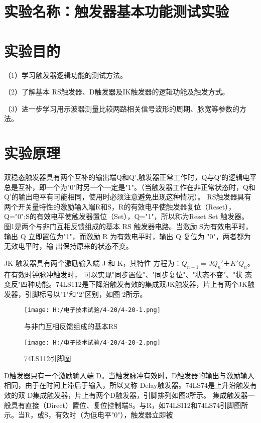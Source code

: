 \documentclass{article}
\begin{document}
	\section{ 实验名称：触发器基本功能测试实验}
    \section{ 实验目的}
     （1）学习触发器逻辑功能的测试方法。\par
               （2）了解基本 RS触发器、D触发器及IK触发器的逻辑功能及触发方式。\par 
               （3）进一步学习用示波器测量比较两路相关信号波形的周期、脉宽等参数的方法。 \par 
 
   	\section{ 实验原理}
       双稳态触发器具有两个互补的输出端Q和Q',触发器正常工作时，Q与Q'的逻辑电平总是互补，即一个为"0"时另一个一定是"1"。（当触发器工作在非正常状态时，Q和Q'的输出电平有可能相同，使用时必须注意避免出现这种情况）。
       RS触发器具有两个开关量特性的激励输入端R和S，R的有效电平使触发器复位（Reset），Q="0";S的有效电平使触发器置位（Set），Q="1"，所以称为Reset Set 触发器。
       图1是两个与非门互相反馈组成的基本 RS
       触发器电路。当激励 S为有效电平时，输出 Q 立即置位为"1"，而激励 R 为有效电平时，输出 Q 复位为
       "0"，两者都为无效电平时，输 出保持原来的状态不变。\par
       JK 触发器具有两个激励输入端 J 和 K，其特性
       方程为∶$Q_{n+1}=JQ_n'＋K'Q_n$。在有效时钟脉冲触发时，
       可以实现"同步置位"、"同步复位"、"状态不变"、"状
       态变反"四种功能。74LS112是下降沿触发有效的集成双JK触发器，片上有两个JK触发器，引脚标号以"1"和"2"区别，如图 2所示。\par
       \begin{figure}[h]
        \begin{minipage}[t]{0.5\linewidth} %
          \centering   
          \texttt{[image: H:/电子技术试验/4-20/4-20-1.png]}   
          \caption{与非门互相反馈组成的基本RS}   
          \label{fig:side:a}   
        \end{minipage}%
        \begin{minipage}[t]{0.5\linewidth}   
          \centering   
          \texttt{[image: H:/电子技术试验/4-20/4-20-2.png]}   
          \caption{74LS112引脚图}   
          \label{fig:side:b}   
        \end{minipage}   
      \end{figure}
      \par
       D触发器只有一个激励输入端 D。当触发脉冲有效时，D触发器的输出与激励输入相同，由于在时间上滞后于输入，所以又称 Delay触发器。74LS74是上升沿触发有效的双 D集成触发器，片上有两个D触发器，引脚排列如图3所示。
       集成触发器一般具有直接（Direct）置位、复位控制端S。与R，如74LSI12和74LS74引脚图所示。当R，或S，有效时（为低电平"0"），触发器立即被
     
\end{document}
